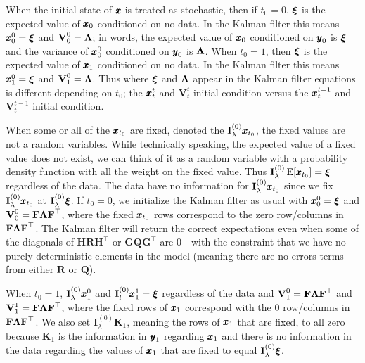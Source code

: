 \documentclass[]{article}
\def\xixi{\mbox{\boldmath $\xi$}}
\def\LAM{\mbox{\boldmath $\Lambda$}}
\def\E{\,\textup{\textrm{E}}}
\def\FF{\mbox{$\mathbf F$}} \def\ff{\mbox{$\mathbf f$}}
\def\GG{\mbox{$\mathbf G$}}	\def\gg{\mbox{$\mathbf g$}}
\def\HH{\mbox{$\mathbf H$}}	\def\hh{\mbox{$\mathbf h$}}
\def\II{\mbox{$\mathbf I$}} \def\ii{\mbox{$\mathbf i$}}
\def\KK{\mbox{$\mathbf K$}}
\def\QQ{\mbox{$\mathbf Q$}}	 \def\qq{\mbox{$\mathbf q$}} \def\Qb{\mbox{$\mathbf G$}}  \def\Qm{\mathbb{Q}}
\def\RR{\mbox{$\mathbf R$}}	 \def\rr{\mbox{$\mathbf r$}} \def\Rb{\mbox{$\mathbf H$}}	\def\Rm{\mathbb{R}}
\def\VV{\mbox{$\mathbf V$}}	\def\vv{\mbox{$\mathbf v$}}
\begin{document}
When the initial state of $\mbox{$\pmb{x}$}$ is treated as stochastic, then if $t_0=0$,  $\xixi$ is the expected value of $\mbox{$\pmb{x}$}_0$ conditioned on no data.  In the Kalman filter this means $\xx_0^0=\xixi$ and $\VV_0^0=\LAM$; in words, the expected value of $\mbox{$\pmb{x}$}_0$ conditioned on $\mbox{$\pmb{y}$}_0$ is $\xixi$ and the variance of $\mbox{$\pmb{x}$}_0^0$ conditioned on $\mbox{$\pmb{y}$}_0$ is $\LAM$.  When $t_0=1$, then $\xixi$ is the expected value of $\mbox{$\pmb{x}$}_1$ conditioned on no data.  In the Kalman filter this means $\xx_1^0=\xixi$ and $\VV_1^0=\LAM$.  Thus where $\xixi$ and $\LAM$ appear in the Kalman filter equations is different depending on $t_0$; the $\mbox{$\pmb{x}$}_t^t$ and $\VV_t^{t}$ initial condition versus the $\mbox{$\pmb{x}$}_t^{t-1}$ and $\VV_t^{t-1}$ initial condition.

When some or all of the $\mbox{$\pmb{x}$}_{t_0}$ are fixed, denoted the $\II_\lambda^{(0)}\xx_{t_0}$, the fixed values are not a random variables.  While technically speaking, the expected value of a fixed value does not exist, we can think of it as a random variable with a probability density function with all the weight on the fixed value.   Thus $\II_\lambda^{(0)}\E[\xx_{t_0}]=\xixi$ regardless of the data.  The data have no information for $\II_\lambda^{(0)}\xx_{t_0}$ since we fix $\II_\lambda^{(0)}\xx_{t_0}$ at $\II_\lambda^{(0)}\xixi$. If $t_0=0$, we initialize the Kalman filter as usual with $\xx_0^0=\xixi$ and $\VV_0^0=\FF\LAM\FF^\top$, where the fixed $\mbox{$\pmb{x}$}_{t_0}$ rows correspond to the zero row/columns in $\FF\LAM\FF^\top$.  The Kalman filter will return the correct expectations even when some of the diagonals of $\HH\RR\HH^\top$ or $\GG\QQ\GG^\top$ are 0---with the constraint that we have no purely deterministic elements in the model (meaning there are no errors terms from either $\RR$ or $\QQ$).  

When $t_0=1$, $\II_\lambda^{(0)}\xx_1^0$ and $\II_l^{(0)}\xx_1^1=\xixi$ regardless of the data and $\VV_1^0=\FF\LAM\FF^\top$ and $\VV_1^1=\FF\LAM\FF^\top$, where the fixed rows of $\mbox{$\pmb{x}$}_1$ correspond with the 0 row/columns in $\FF\LAM\FF^\top$.  We also set $\II_\lambda^{(0)}\KK_1$, meaning the rows of $\mbox{$\pmb{x}$}_1$ that are fixed, to all zero because $\KK_1$ is the information in $\mbox{$\pmb{y}$}_1$ regarding $\mbox{$\pmb{x}$}_1$ and there is no information in the data regarding the values of $\mbox{$\pmb{x}$}_1$ that are fixed to equal $\II_\lambda^{(0)}\xixi$.  
\end{document}
